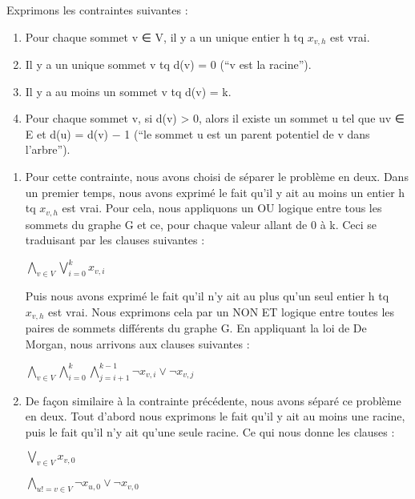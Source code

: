 \documentclass[a4paper]{article}
\begin{document}
Exprimons les contraintes suivantes : \\
\begin{enumerate}

\item Pour chaque sommet v ∈ V, il y a un unique entier h tq $x_{v,h}$ est vrai.
\item Il y a un unique sommet v tq d(v) = 0 (“v est la racine”).
\item Il y a au moins un sommet v tq d(v) = k.
\item Pour chaque sommet v, si d(v) > 0, alors il existe un sommet u tel que uv ∈ E et d(u) = d(v) − 1 (“le sommet u est un parent potentiel de v dans l’arbre”).
\end{enumerate}

\begin{enumerate}
\item
Pour cette contrainte, nous avons choisi de séparer le problème en deux.
Dans un premier temps, nous avons exprimé le fait qu'il y ait au moins un entier
h tq $x_{v, h}$ est vrai. Pour cela, nous appliquons un OU logique entre tous les
sommets du graphe G et ce, pour chaque valeur allant de 0 à k. Ceci se traduisant
par les clauses suivantes :
\begin{center}
$\bigwedge\limits_{v∈V}^{} \bigvee\limits_{i=0}^{k} x_{v,i}$
\end{center}

Puis nous avons exprimé le fait qu'il n'y ait au plus qu'un seul entier h tq
$x_{v, h}$ est vrai. Nous exprimons cela par un NON ET logique entre toutes les
paires de sommets différents du graphe G. En appliquant la loi de De Morgan, nous
arrivons aux clauses suivantes :
\begin{center}
$\bigwedge\limits_{v∈V}^{} \bigwedge\limits_{i=0}^{k} \bigwedge\limits_{j=i+1}^{k-1} \neg x_{v,i} \vee \neg x_{v,j} $
\end{center}

\item
De façon similaire à la contrainte précédente, nous avons séparé ce problème en
deux. Tout d'abord nous exprimons le fait qu'il y ait au moins une racine, puis
le fait qu'il n'y ait qu'une seule racine. Ce qui nous donne les clauses : \\
\begin{center}
$\bigvee\limits_{v∈V}^{} x_{v,0} $
\end{center}

\begin{center}
$\bigwedge\limits_{u!=v∈V}^{} \neg x_{u,0} \vee \neg x_{v,0}$
\end{center}







\end{enumerate}
\end{document}

